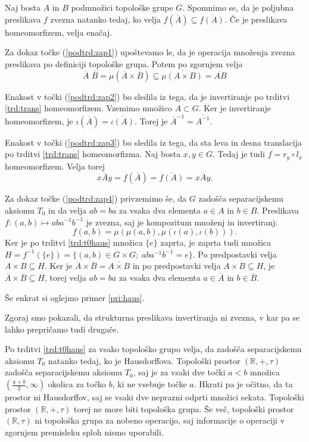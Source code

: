 \documentclass[mat1]{fmfdelo}
\newcommand{\R}{\mathbb R}
\newcommand{\closure}[1]{\overline{#1}}
\begin{document}
\begin{dokaz}
	Naj bosta $A$ in $B$ podmnožici topološke grupe $G$. Spomnimo se, da je poljubna preslikava $f$ zvezna natanko tedaj, ko velja $f(\closure{A}) \subseteq \closure{f(A)}$. Če je preslikava homeomorfizem, velja enačaj.
	
	Za dokaz točke (\ref{podtrd:zap1}) upoštevamo le, da je operacija množenja zvezna preslikava po definiciji topološke grupa. Potem po zgornjem velja
	\[ \closure{A}\;\closure{B} = \mu(\closure{A}\times\closure{B}) \subseteq \closure{\mu(A\times B)} = \closure{AB}\]
	
	Enakost v točki (\ref{podtrd:zap2}) bo sledila iz tega, da je invertiranje po trditvi \ref{trd:trans} homeomorfizem. Vzemimo množico $A \subset G$. Ker je invertiranje homeomorfizem, je $\iota(\closure{A}) = \closure{\iota(A)}$. Torej je $\closure{A}^{-1} = \closure{A^{-1}}$.
	
	Enakost v točki (\ref{podtrd:zap3}) bo sledila iz tega, da sta leva in desna translacija po trditvi \ref{trd:trans} homeomorfizma. Naj bosta $x, y \in G$. Tedaj je tudi $f = r_y \circ l_x$ homeomorfizem. Velja torej
	\[ x\closure{A}y = f(\closure{A}) = \closure{f(A)} = \closure{xAy}. \]
	
	Za dokaz točke (\ref{podtrd:zap4}) privzemimo še, da $G$ zadošča separacijskemu aksiomu $T_0$ in da velja $ab = ba$ za vsaka dva elementa $a \in A$ in $b \in B$. Preslikava $f\colon (a,b) \mapsto aba^{-1}b^{-1}$ je zvezna, saj je kompozitum množenj in invertiranj:
	\[ f(a, b) = \mu(\mu(a, b),\mu(\iota(a), \iota(b))). \]
	Ker je po trditvi \ref{trd:t0haus} množica $\lbrace e \rbrace$ zaprta, je zaprta tudi množica $H = f^{-1}(\lbrace e \rbrace) = \lbrace (a, b) \in G \times G ;\; aba^{-1}b^{-1} = e \rbrace$. Po predpostavki velja $A \times B \subseteq H$.
	Ker je $\closure{A}\times\closure{B} = \closure{A \times B}$ in po predpostavki velja $A \times B \subseteq H$, je $\closure{A}\times\closure{B} \subseteq H$, torej velja $ab = ba$ za vsaka dva elementa $a \in \closure{A}$ in $b \in \closure{B}$.
\end{dokaz}

Še enkrat si oglejmo primer \ref{pri:haus}.
\begin{primer}\label{pri:haus2}
	Zgoraj smo pokazali, da strukturna preslikava invertiranja ni zvezna, v kar pa se lahko prepričamo tudi drugače.
	
	Po trditvi \ref{trd:t0haus} za vsako topološko grupo velja, da zadošča separacijskemu aksiomu $T_0$ natanko tedaj, ko je Hausdorffova. Topološki prostor $(\R, +, \tau)$ zadošča separacijskemu aksiomu $T_0$, saj je za vsaki dve točki $a < b$ množica $(\frac{a+b}{2}, \infty)$ okolica za točko $b$, ki ne vsebuje točke $a$. Hkrati pa je očitno, da ta prostor ni Hausdorffov, saj se vsaki dve neprazni odprti množici sekata. Topološki prostor $(\R, +, \tau)$ torej ne more biti topološka grupa. Še več, topološki prostor $(\R, \tau)$ ni topološka grupa za nobeno operacijo, saj informacije o operaciji v zgornjem premisleku sploh nismo uporabili.
\end{primer}
\end{document}
